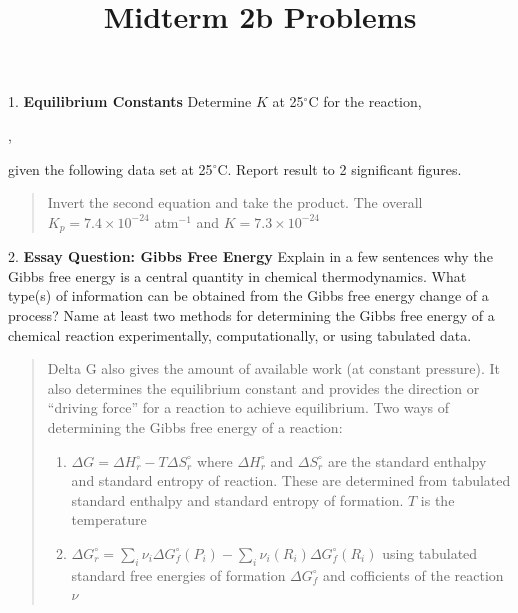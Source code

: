 \documentclass[11pt]{article}
\title{\textbf{Midterm 2b Problems}}
\newcommand{\brian}[1]{
  {\begin{quote}
      \color{blue} #1
  \end{quote}}
}
\begin{document}
\maketitle

1. \textbf{Equilibrium Constants} Determine $K$ at 25$^\circ$C
for the reaction,
\begin{center}
  ,
\end{center}
given the following data set at 25$^\circ$C. Report result to 2 significant figures.
\begin{center}


\end{center}

\brian{Invert the second equation and take the product. The overall $K_p = 7.4\times 10^{-24}$ atm$^{-1}$
  and $K = 7.3\times 10^{-24}$
}


2. \textbf{Essay Question: Gibbs Free Energy} Explain in a few sentences why the Gibbs
free energy is a central quantity in chemical thermodynamics. What type(s) of information
can be obtained from the Gibbs free energy change of a process? Name at least two methods
for determining the Gibbs free energy of a chemical reaction experimentally, computationally,
or using tabulated data.

\brian{Delta G also gives the amount of available work (at constant pressure).
  It also determines the equilibrium constant and provides the direction or ``driving force''
  for a reaction to achieve equilibrium. Two ways of determining the Gibbs free energy of a reaction:
  \begin{enumerate}
  \item $\Delta G = \Delta H^\circ_r - T\Delta S^\circ_r$ where $\Delta H^\circ_r$ and $\Delta S^\circ_r$
    are the standard enthalpy and standard entropy of reaction. These are determined from tabulated
    standard enthalpy and standard entropy of formation. $T$ is the temperature
  \item $\Delta G^\circ_r = \sum_i \nu_i\Delta G^\circ_f(P_i)-\sum_i\nu_i(R_i)\Delta G^\circ_f(R_i)$
    using tabulated standard free energies of formation $\Delta G^\circ_f$ and cofficients of the reaction
    $\nu$
  \end{enumerate}
}
\end{document}
